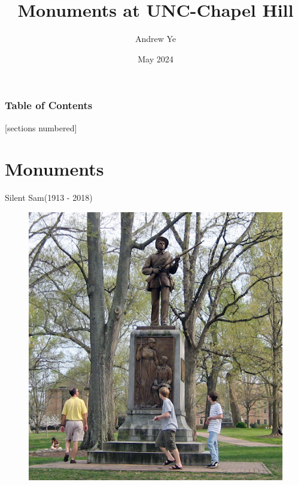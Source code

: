 \documentclass[10pt]{beamer}
\title{Monuments at UNC-Chapel Hill}
\date{May 2024}
\author{Andrew Ye}
\begin{document}
\frame{\titlepage}

\begin{frame}
\frametitle{Table of Contents}
[sections numbered]
\tableofcontents
\end{frame}

\section{Monuments}

\begin{frame}{Silent Sam(1913 - 2018)}
    \begin{minipage}{0.5\textwidth}
    \begin{figure}
        \includegraphics[scale = 0.3]{photos/photo1.png}
    \end{figure}
    \end{minipage}
    \begin{minipage}{0.4\textwidth}
    \begin{figure}

\end{figure}
\end{minipage}
\end{frame}
\end{document}
